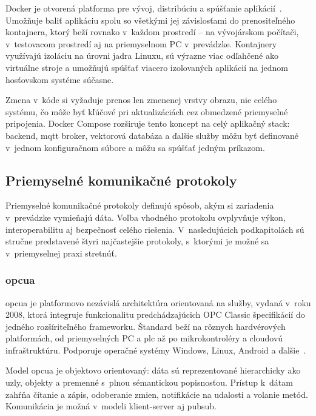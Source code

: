 Docker je otvorená platforma pre vývoj, distribúciu a spúšťanie
aplikácií~\cite{t11}. Umožňuje baliť aplikáciu spolu so všetkými jej
závislosťami do prenositeľného kontajnera, ktorý beží rovnako v~každom
prostredí -- na vývojárskom počítači, v~testovacom prostredí aj na priemyselnom
PC v~prevádzke. Kontajnery využívajú izoláciu na úrovni jadra Linuxu, sú
výrazne viac odľahčené ako virtuálne stroje a umožňujú spúšťať viacero
izolovaných aplikácií na jednom hosťovskom systéme súčasne.

Zmena v~kóde si vyžaduje prenos len zmenenej vrstvy obrazu, nie celého systému,
čo môže byť kľúčové pri aktualizáciách cez obmedzené priemyselné pripojenia.
Docker Compose rozširuje tento koncept na celý aplikačný stack: backend,
\acrshort{mqtt} broker, vektorová databáza a ďalšie služby môžu byť definované
v~jednom konfiguračnom súbore a môžu sa spúšťať jedným príkazom.

\subsection{Priemyselné komunikačné protokoly}

Priemyselné komunikačné protokoly definujú spôsob, akým si zariadenia
v~prevádzke vymieňajú dáta. Voľba vhodného protokolu
ovplyvňuje výkon, interoperabilitu aj bezpečnosť celého riešenia.
V~nasledujúcich podkapitolách sú stručne predstavené štyri najčastejšie
protokoly, s~ktorými je možné sa v~priemyselnej praxi stretnúť.

\subsubsection{\acrshort{opcua}}

\acrshort{opcua} je platformovo nezávislá architektúra orientovaná na služby, vydaná v~roku 2008, ktorá integruje
funkcionalitu predchádzajúcich OPC Classic špecifikácií do jedného
rozšíriteľného frameworku. Štandard beží na rôznych hardvérových
platformách, od priemyselných PC a \acrshort{plc} až po mikrokontroléry
a cloudovú infraštruktúru. Podporuje operačné systémy Windows, Linux,
Android a ďalšie~\cite{t12}.

Model \acrshort{opcua} je objektovo orientovaný: dáta sú reprezentované
hierarchicky ako uzly, objekty a premenné s~plnou sémantickou popisnosťou.
Prístup k~dátam zahŕňa čítanie a zápis, odoberanie zmien, notifikácie na
udalosti a volanie metód. Komunikácia je možná v~modeli klient-server aj
\acrshort{pubsub}.

